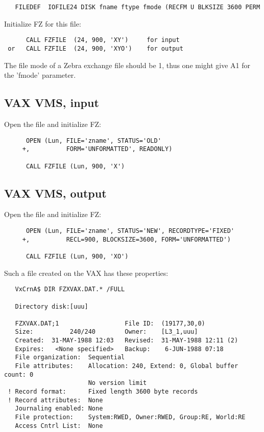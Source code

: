 \begin{verbatim}
   FILEDEF  IOFILE24 DISK fname ftype fmode (RECFM U BLKSIZE 3600 PERM
\end{verbatim}

Initialize FZ for this file:

\begin{verbatim}
      CALL FZFILE  (24, 900, 'XY')     for input
 or   CALL FZFILE  (24, 900, 'XYO')    for output
\end{verbatim}

The file mode of a Zebra exchange file should be 1,
thus one might give A1 for the 'fmode' parameter.

\subsection*{VAX VMS, input}

Open the file and initialize FZ:

\begin{verbatim}
      OPEN (Lun, FILE='zname', STATUS='OLD'
     +,          FORM='UNFORMATTED', READONLY)

      CALL FZFILE (Lun, 900, 'X')
\end{verbatim}

\subsection*{VAX VMS, output}

Open the file and initialize FZ:

\begin{verbatim}
      OPEN (Lun, FILE='zname', STATUS='NEW', RECORDTYPE='FIXED'
     +,          RECL=900, BLOCKSIZE=3600, FORM='UNFORMATTED')

      CALL FZFILE (Lun, 900, 'XO')
\end{verbatim}

Such a file created on the VAX has these properties:

\begin{verbatim}
   VxCrnA$ DIR FZXVAX.DAT.* /FULL

   Directory disk:[uuu]

   FZXVAX.DAT;1                  File ID:  (19177,30,0)
   Size:          240/240        Owner:    [L3_1,uuu]
   Created:  31-MAY-1988 12:03   Revised:  31-MAY-1988 12:11 (2)
   Expires:   <None specified>   Backup:    6-JUN-1988 07:18
   File organization:  Sequential
   File attributes:    Allocation: 240, Extend: 0, Global buffer count: 0
                       No version limit
 ! Record format:      Fixed length 3600 byte records
 ! Record attributes:  None
   Journaling enabled: None
   File protection:    System:RWED, Owner:RWED, Group:RE, World:RE
   Access Cntrl List:  None
\end{verbatim}


